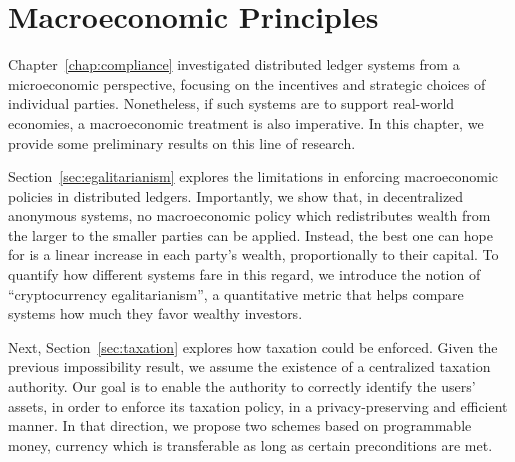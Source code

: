 \chapter{
    Macroeconomic Principles
}\label{chap:macroeconomics}

Chapter~\ref{chap:compliance} investigated distributed ledger systems from a
microeconomic perspective, focusing on the incentives and strategic choices of
individual parties. Nonetheless, if such systems are to support real-world
economies, a macroeconomic treatment is also imperative. In this chapter, we
provide some preliminary results on this line of research.

Section~\ref{sec:egalitarianism} explores the limitations in enforcing
macroeconomic policies in distributed ledgers. Importantly, we show that, in
decentralized anonymous systems, no macroeconomic policy which redistributes
wealth from the larger to the smaller parties can be applied. Instead, the best
one can hope for is a linear increase in each party's wealth, proportionally to
their capital. To quantify how different systems fare in this regard, we
introduce the notion of ``cryptocurrency egalitarianism'', a quantitative
metric that helps compare systems \wrt how much they favor wealthy investors.

Next, Section~\ref{sec:taxation} explores how taxation could be enforced. Given
the previous impossibility result, we assume the existence of a centralized
taxation authority. Our goal is to enable the authority to correctly identify
the users' assets, in order to enforce its taxation policy, in a
privacy-preserving and efficient manner. In that direction, we propose two
schemes based on programmable money, \ie currency which is transferable as long
as certain preconditions are met.



